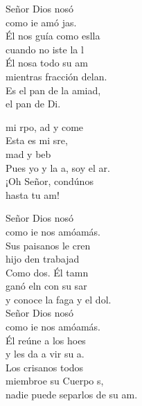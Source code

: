 \begin{cancion}%
	 Señor Dios nosó\\
	como ie amó jas. \\
	Él nos guía como eslla\\
	cuando no iste la l\\
	Él nosa todo su am\\
	mientras fracción delan.\\
	Es el pan de la amiad,\\
	el pan de Di.   \jump\\
	\begin{chorus}%
		 mi rpo, ad y come\\
		Esta es mi sre,\\
		mad y beb\\
		Pues yo y la a, soy el ar.\\
		¡Oh Señor, condúnos \\
		hasta tu am!   \jump\\
	\end{chorus}%
	 Señor Dios nosó\\
	como ie nos amóamás.\\
	Sus paisanos le cren\\
	hijo den trabajad\\
	Como dos. Él tamn \\
	ganó eln con su sar\\
	y conoce la faga y el dol. \\
	\jump
	 Señor Dios nosó\\
	como ie nos amóamás.\\
	Él reúne a los hoes\\
	y les da a vir su a.\\
	Los crisanos todos \\
	miembroe su Cuerpo s,\\
	nadie puede separlos de su am. \\
	\jump
\end{cancion}%
